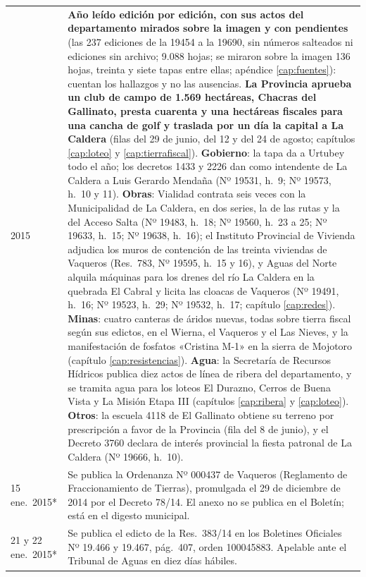\begin{longtable}{@{}p{2.7cm}p{10.3cm}@{}}
2015 & \textbf{Año leído edición por edición, con sus actos del departamento mirados sobre la imagen y con pendientes} (las 237 ediciones de la 19454 a la 19690, sin números salteados ni ediciones sin archivo; 9.088 hojas; se miraron sobre la imagen 136 hojas, treinta y siete tapas entre ellas; apéndice \ref{cap:fuentes}): cuentan los hallazgos y no las ausencias. \textbf{La Provincia aprueba un club de campo de 1.569 hectáreas, Chacras del Gallinato, presta cuarenta y una hectáreas fiscales para una cancha de golf y traslada por un día la capital a La Caldera} (filas del 29 de junio, del 12 y del 24 de agosto; capítulos \ref{cap:loteo} y \ref{cap:tierrafiscal}). \textbf{Gobierno}: la tapa da a Urtubey todo el año; los decretos 1433 y 2226 dan como intendente de La Caldera a Luis Gerardo Mendaña (Nº 19531, h.\ 9; Nº 19573, h.\ 10 y 11). \textbf{Obras}: Vialidad contrata seis veces con la Municipalidad de La Caldera, en dos series, la de las rutas y la del Acceso Salta (Nº 19483, h.\ 18; Nº 19560, h.\ 23 a 25; Nº 19633, h.\ 15; Nº 19638, h.\ 16); el Instituto Provincial de Vivienda adjudica los muros de contención de las treinta viviendas de Vaqueros (Res.\ 783, Nº 19595, h.\ 15 y 16), y Aguas del Norte alquila máquinas para los drenes del río La Caldera en la quebrada El Cabral y licita las cloacas de Vaqueros (Nº 19491, h.\ 16; Nº 19523, h.\ 29; Nº 19532, h.\ 17; capítulo \ref{cap:redes}). \textbf{Minas}: cuatro canteras de áridos nuevas, todas sobre tierra fiscal según sus edictos, en el Wierna, el Vaqueros y el Las Nieves, y la manifestación de fosfatos «Cristina M-1» en la sierra de Mojotoro (capítulo \ref{cap:resistencias}). \textbf{Agua}: la Secretaría de Recursos Hídricos publica diez actos de línea de ribera del departamento, y se tramita agua para los loteos El Durazno, Cerros de Buena Vista y La Misión Etapa III (capítulos \ref{cap:ribera} y \ref{cap:loteo}). \textbf{Otros}: la escuela 4118 de El Gallinato obtiene su terreno por prescripción a favor de la Provincia (fila del 8 de junio), y el Decreto 3760 declara de interés provincial la fiesta patronal de La Caldera (Nº 19666, h.\ 10). \\
15 ene.\ 2015* & Se publica la Ordenanza Nº 000437 de Vaqueros (Reglamento de Fraccionamiento de Tierras), promulgada el 29 de diciembre de 2014 por el Decreto 78/14. El anexo no se publica en el Boletín; está en el digesto municipal. \\
21 y 22 ene.\ 2015* & Se publica el edicto de la Res.\ 383/14 en los Boletines Oficiales Nº 19.466 y 19.467, pág.\ 407, orden 100045883. Apelable ante el Tribunal de Aguas en diez días hábiles. \\

\end{longtable}
